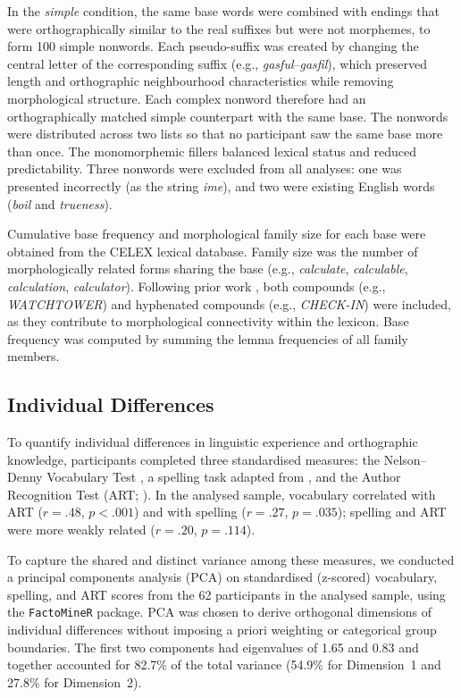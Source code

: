 \documentclass[utf8]{FrontiersinHarvard} %
\begin{document}
In the \textit{simple} condition, the same base words were combined with endings that were orthographically similar to the real suffixes but were not morphemes, to form 100 simple nonwords. Each pseudo-suffix was created by changing the central letter of the corresponding suffix (e.g., \textit{gasful}--\textit{gasfil}), which preserved length and orthographic neighbourhood characteristics while removing morphological structure. Each complex nonword therefore had an orthographically matched simple counterpart with the same base. The nonwords were distributed across two lists so that no participant saw the same base more than once. The monomorphemic fillers balanced lexical status and reduced predictability. Three nonwords were excluded from all analyses: one was presented incorrectly (as the string \textit{ime}), and two were existing English words (\textit{boil} and \textit{trueness}).

Cumulative base frequency and morphological family size for each base were obtained from the CELEX lexical database. Family size was the number of morphologically related forms sharing the base (e.g., \textit{calculate}, \textit{calculable}, \textit{calculation}, \textit{calculator}). Following prior work \citep[e.g.,][]{dejongMorphologicalFamilySize2000, dejongProcessingRepresentationDutch2002}, both compounds (e.g., \textit{WATCHTOWER}) and hyphenated compounds (e.g., \textit{CHECK-IN}) were included, as they contribute to morphological connectivity within the lexicon. Base frequency was computed by summing the lemma frequencies of all family members.

\subsection{Individual Differences}

To quantify individual differences in linguistic experience and orthographic knowledge, participants completed three standardised measures: the Nelson--Denny Vocabulary Test \citep{brownNelsonDennyReadingTest1993}, a spelling task adapted from \citet{sawiIndividualDifferencesSensitivity2016}, and the Author Recognition Test (ART; \citealt{stanovichExposurePrintOrthographic1989}). In the analysed sample, vocabulary correlated with ART ($r = .48$, $p < .001$) and with spelling ($r = .27$, $p = .035$); spelling and ART were more weakly related ($r = .20$, $p = .114$).

To capture the shared and distinct variance among these measures, we conducted a principal components analysis (PCA) on standardised (z-scored) vocabulary, spelling, and ART scores from the 62 participants in the analysed sample, using the \texttt{FactoMineR} package. PCA was chosen to derive orthogonal dimensions of individual differences without imposing a priori weighting or categorical group boundaries. The first two components had eigenvalues of 1.65 and 0.83 and together accounted for 82.7\% of the total variance (54.9\% for Dimension~1 and 27.8\% for Dimension~2). %
\end{document}
